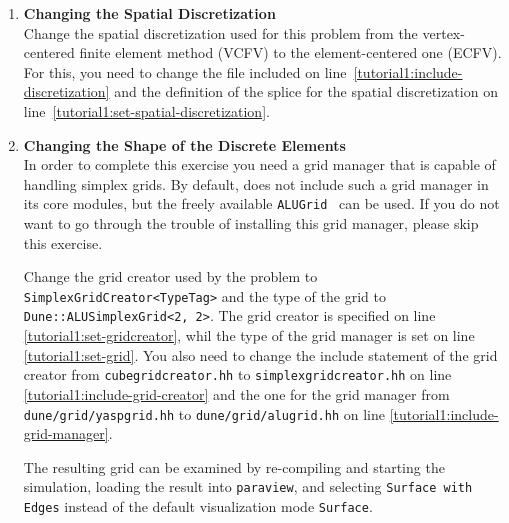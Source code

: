 \begin{enumerate}
\item \textbf{Changing the Spatial Discretization} \\
  Change the spatial discretization used for this problem from the
  vertex-centered finite element method (VCFV) to the element-centered
  one (ECFV). For this, you need to change the file included on
  line~\ref{tutorial1:include-discretization} and the definition of
  the splice for the spatial discretization on
  line~\ref{tutorial1:set-spatial-discretization}.

\item \textbf{Changing the Shape of the Discrete Elements} \\
  In order to complete this exercise you need a \Dune grid manager
  that is capable of handling simplex grids. By default, \Dune does
  not include such a grid manager in its core modules, but the freely
  available \texttt{ALUGrid}~\cite{ALUGRID-HP} can be used. If you do
  not want to go through the trouble of installing this grid manager,
  please skip this exercise.

  Change the grid creator used by the problem to
  \texttt{SimplexGridCreator<TypeTag>} and the type of the grid to
  \texttt{Dune::ALUSimplexGrid<2, 2>}. The grid creator is specified
  on line \ref{tutorial1:set-gridcreator}, whil the type of the
  \Dune grid manager is set on line
  \ref{tutorial1:set-grid}. You also need to change the include
  statement of the grid creator from \texttt{cubegridcreator.hh} to
  \texttt{simplexgridcreator.hh} on line
  \ref{tutorial1:include-grid-creator} and the one for the grid
  manager from \texttt{dune/grid/yaspgrid.hh} to
  \texttt{dune/grid/alugrid.hh} on line \ref{tutorial1:include-grid-manager}.

  The resulting grid can be examined by re-compiling and starting the
  simulation, loading the result into \texttt{paraview}, and selecting
  \texttt{Surface with Edges} instead of the default visualization
  mode \texttt{Surface}.


\end{enumerate}
